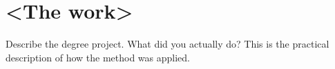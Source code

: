 \documentclass[/home/francois/latex/report/main.tex]{subfiles}
\begin{document}
\chapter{<The work>}

Describe the degree project. What did you actually do? This is the practical description of how the method was applied.
\end{document}
